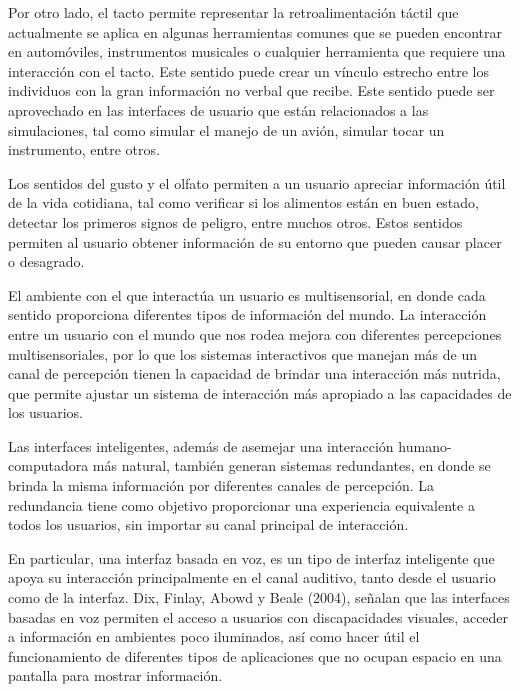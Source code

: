 Por otro lado, el tacto permite representar la retroalimentación táctil que actualmente se aplica en algunas herramientas comunes que se pueden encontrar en automóviles, instrumentos musicales o cualquier herramienta que requiere una interacción con el tacto. Este sentido puede crear un vínculo estrecho entre los individuos con la gran información no verbal que recibe. Este sentido puede ser aprovechado en las interfaces de usuario que están relacionados a las simulaciones, tal como simular el manejo de un avión, simular tocar un instrumento, entre otros.

Los sentidos del gusto y el olfato permiten a un usuario apreciar información útil de la vida cotidiana, tal como verificar si los alimentos están en buen estado, detectar los primeros signos de peligro, entre muchos otros. Estos sentidos permiten al usuario obtener información de su entorno que pueden causar placer o desagrado.

El ambiente con el que interactúa un usuario es multisensorial, en donde cada sentido proporciona diferentes tipos de información del mundo. La interacción entre un usuario con el mundo que nos rodea mejora con diferentes percepciones multisensoriales, por lo que los sistemas interactivos que manejan más de un canal de percepción tienen la capacidad de brindar una interacción más nutrida, que permite ajustar un sistema de interacción más apropiado a las capacidades de los usuarios.

Las interfaces inteligentes, además de asemejar una interacción humano-computadora más natural, también generan sistemas redundantes, en donde se brinda la misma información por diferentes canales de percepción. La redundancia tiene como objetivo proporcionar una experiencia equivalente a todos los usuarios, sin importar su canal principal de interacción.

En particular, una interfaz basada en voz, es un tipo de interfaz inteligente que apoya su interacción principalmente en el canal auditivo, tanto desde el usuario como de la interfaz. Dix, Finlay, Abowd y Beale (2004), señalan que las interfaces basadas en voz permiten el acceso a usuarios con discapacidades visuales, acceder a información en ambientes poco iluminados, así como hacer útil el funcionamiento de diferentes tipos de aplicaciones que no ocupan espacio en una pantalla para mostrar información.


